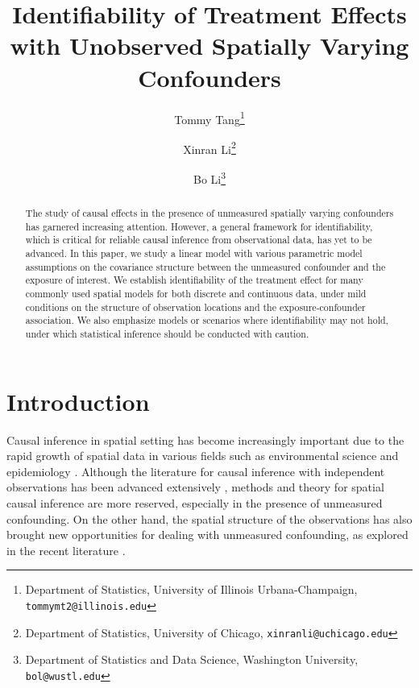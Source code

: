 \documentclass[11pt]{article}
\theoremstyle{definition}
\theoremstyle{remark}
\begin{document}
\title{Identifiability of Treatment Effects with Unobserved Spatially Varying Confounders}

\author{
Tommy Tang\thanks{Department of Statistics, University of Illinois Urbana-Champaign, 
\texttt{tommymt2@illinois.edu}}
\and
Xinran Li\thanks{Department of Statistics, University of Chicago,
\texttt{xinranli@uchicago.edu}}
\and
Bo Li\thanks{Department of Statistics and Data Science, Washington University,
\texttt{bol@wustl.edu}}
}

\date{}  %

\maketitle


\begin{abstract}
The study of causal effects in the presence of unmeasured spatially varying confounders has garnered increasing attention. However, a general framework for identifiability, which is critical for reliable causal inference from observational data, has yet to be advanced. 
In this paper, we study a linear model with various parametric model assumptions on the covariance structure between the unmeasured confounder and the exposure of interest. 
We establish identifiability of the treatment effect for many commonly used spatial models for both discrete and continuous data, under mild conditions on the structure of observation locations and the exposure-confounder association. We also emphasize models or scenarios where identifiability may not hold, under which statistical inference should be conducted with caution.
\end{abstract}


\section{Introduction}
Causal inference in spatial setting has become increasingly important due to the rapid growth of spatial data in various fields such as environmental science and epidemiology \citep{reich2021review, gilbert2021approaches, schnell2020mitigating,guan2023spectral}.
Although the literature for causal inference with independent observations has been advanced extensively \citep[see, e.g.,][]{imbens2015causal, hernan2020causal}, methods and theory for spatial causal inference are more reserved, especially in the presence of unmeasured confounding.  
On the other hand, the spatial structure of the observations has also brought new opportunities for dealing with unmeasured confounding, as explored in the recent literature \citep{bind2019causal, gao2022causal, davis2019addressing}.
\end{document}

